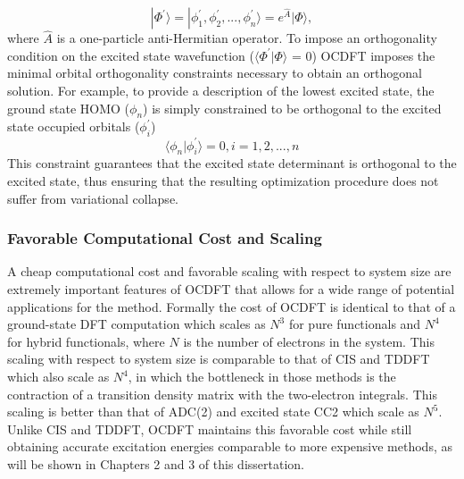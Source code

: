 \documentclass{article}
\begin{document}
\begin{equation}
|\Phi^{\prime} \rangle = |\phi_1^{\prime}, \phi_2^{\prime}, ..., \phi_n^{\prime} \rangle = e^{\hat{A}}|\Phi\rangle,
\end{equation}
where $\hat{A}$ is a one-particle anti-Hermitian operator. To impose an orthogonality condition on the excited state wavefunction ($\langle \Phi^{\prime}|\Phi\rangle$ = 0) OCDFT imposes the minimal orbital orthogonality constraints necessary to obtain an orthogonal solution. For example, to provide a description of the lowest excited state, the ground state HOMO ($\phi_n$) is simply constrained to be orthogonal to the excited state occupied orbitals ($\phi_i^{\prime}$) 
\begin{equation}
\langle \phi_n|\phi_i^{\prime} \rangle = 0, i = 1,2,...,n
\end{equation}
This constraint guarantees that the excited state determinant is orthogonal to the excited state, thus ensuring that the resulting optimization procedure does not suffer from variational collapse. 
\subsubsection{Favorable Computational Cost and Scaling}
A cheap computational cost and favorable scaling with respect to system size are extremely important features of OCDFT that allows for a wide range of potential applications for the method. Formally the cost of OCDFT is identical to that of a ground-state DFT computation which scales as $N^3$ for pure functionals and $N^4$ for hybrid functionals, where $N$ is the number of electrons in the system. This scaling with respect to system size is comparable to that of CIS and TDDFT which also scale as $N^4$, in which the bottleneck in those methods is the contraction of a transition density matrix with the two-electron integrals. This scaling is better than that of ADC(2) and excited state CC2 which scale as $N^5$. Unlike CIS and TDDFT, OCDFT maintains this favorable cost while still obtaining accurate excitation energies comparable to more expensive methods, as will be shown in Chapters 2 and 3 of this dissertation.
\end{document}

